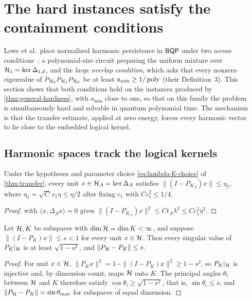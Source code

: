 \section{The hard instances satisfy the containment conditions}
\label{sec:advantage}

Lowe et al.\ place normalized harmonic persistence in \(\mathsf{BQP}\) under two
access conditions~\cite[Lemma~7]{lowe2026normalized}: a polynomial-size
circuit preparing the uniform mixture over \(\mathcal{H}_1=\ker\Delta_{1,d}\), and
the \emph{large overlap condition}, which asks that every nonzero eigenvalue
of \(P_{\mathcal{H}_2}P_{\mathcal{H}_1}P_{\mathcal{H}_2}\) be at least \(a_{\min}\ge1/\operatorname{poly}\)
(their Definition~3).  This section shows that both conditions hold on the
instances produced by \cref{thm:general-hardness}, with \(a_{\min}\) close to
one, so that on this family the problem is simultaneously hard and
solvable in quantum polynomial time.  The mechanism is that the transfer
estimate, applied at zero energy, forces every harmonic vector to lie close
to the embedded logical kernel.

\subsection{Harmonic spaces track the logical kernels}

\begin{lemma}
\label{lem:harmonic-concentration}
Under the hypotheses and parameter choice \cref{eq:lambda-E-choice} of
\cref{thm:transfer}, every unit \(x\in\mathcal{H}_A=\ker\Delta_A\) satisfies
\(\|(I-P_{K_A})x\|\le\eta_1\), where \(\eta_1=\sqrt C\,c_1\eta\le\eta/2\) after
fixing \(c_1\) with \(Cc_1^2\le1/4\).
\end{lemma}

\begin{proof}
 with \(\langle x,\Delta_Ax\rangle=0\) gives
\(\|(I-P_{K_A})x\|^2\le Ct_A\lambda^2\le Cc_1^2\eta^2\).
\end{proof}

\begin{lemma}
\label{lem:equal-dimensions}
Let \(\mathcal{H},K\) be subspaces with \(\dim\mathcal{H}=\dim K<\infty\), and suppose
\(\|(I-P_K)x\|\le s<1\) for every unit \(x\in\mathcal{H}\).  Then every singular
value of \(P_K|_{\mathcal{H}}\) is at least \(\sqrt{1-s^2}\), and
\(\|P_{\mathcal{H}}-P_K\|\le s\).
\end{lemma}

\begin{proof}
For unit \(x\in\mathcal{H}\), \(\|P_Kx\|^2=1-\|(I-P_K)x\|^2\ge1-s^2\), so
\(P_K|_{\mathcal{H}}\) is injective and, by dimension count, maps \(\mathcal{H}\) onto
\(K\).  The principal angles \(\theta_i\) between \(\mathcal{H}\) and \(K\)
therefore satisfy \(\cos\theta_i\ge\sqrt{1-s^2}\), that is,
\(\sin\theta_i\le s\), and \(\|P_{\mathcal{H}}-P_K\|=\sin\theta_{\max}\) for
subspaces of equal dimension.
\end{proof}

